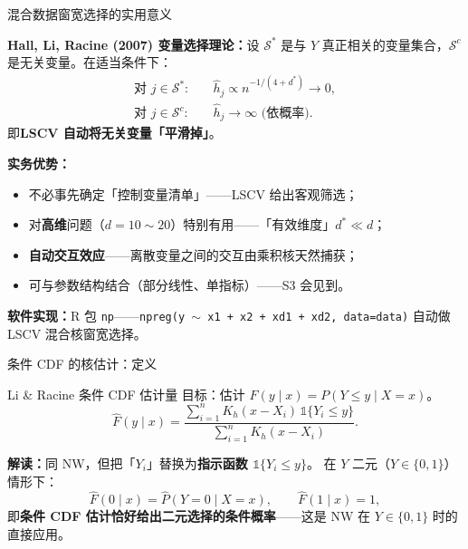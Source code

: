 \documentclass[aspectratio=169, 10pt]{beamer}
\begin{document}
\begin{frame}{混合数据窗宽选择的实用意义}

  \begin{highlightbox}
    \textbf{Hall, Li, Racine (2007) 变量选择理论：}设 $\mathcal{S}^*$ 是与 $Y$ 真正相关的变量集合，$\mathcal{S}^c$ 是无关变量。在适当条件下：
    \begin{align*}
      \text{对 }j\in\mathcal{S}^*: & \quad \hat h_j \propto n^{-1/(4+d^*)} \to 0,\\
      \text{对 }j\in\mathcal{S}^c: & \quad \hat h_j \to\infty \text{ (依概率)}.
    \end{align*}
    即\textbf{LSCV 自动将无关变量「平滑掉」}。
  \end{highlightbox}

  \vspace{0.3em}

  \textbf{实务优势：}
  \begin{itemize}
    \item 不必事先确定「控制变量清单」——LSCV 给出客观筛选；
    \item 对\textbf{高维}问题（$d=10\sim 20$）特别有用——「有效维度」$d^*\ll d$；
    \item \textbf{自动交互效应}——离散变量之间的交互由乘积核天然捕获；
    \item 可与参数结构结合（部分线性、单指标）——S3 会见到。
  \end{itemize}

  \begin{keybox}
    \textbf{软件实现：}R 包 \texttt{np}——\texttt{npreg(y $\sim$ x1 + x2 + xd1 + xd2, data=data)} 自动做 LSCV 混合核窗宽选择。
  \end{keybox}

\end{frame}


\begin{frame}{条件 CDF 的核估计：定义}

  \begin{definitionbox}{Li \& Racine 条件 CDF 估计量}
    目标：估计 $F(y\mid x) = P(Y\leq y\mid X=x)$。
    \[
      \hat F(y\mid x) = \frac{\sum_{i=1}^n K_h(x - X_i)\,\mathds{1}\{Y_i\leq y\}}{\sum_{i=1}^n K_h(x - X_i)}.
    \]
  \end{definitionbox}

  \textbf{解读：}同 NW，但把「$Y_i$」替换为\textbf{指示函数 $\mathds{1}\{Y_i\leq y\}$}。
  在 $Y$ 二元（$Y\in\{0,1\}$）情形下：
  \[
    \hat F(0\mid x) = \hat P(Y=0\mid X=x),\qquad \hat F(1\mid x) = 1,
  \]
  即\textbf{条件 CDF 估计恰好给出二元选择的条件概率}——这是 NW 在 $Y\in\{0,1\}$ 时的直接应用。

\end{frame}
\end{document}
